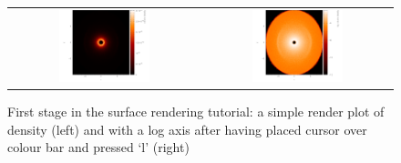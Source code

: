 \documentclass[a4paper,10pt]{article}
\begin{document}
\begin{figure}[h]
\begin{center}
\begin{tabular}{cc}
\includegraphics[width=0.5\textwidth]{surfpart1.png} &
\includegraphics[width=0.5\textwidth]{surfpart2.png}
\end{tabular}
\caption{First stage in the surface rendering tutorial: a simple render plot of density (left) and with a log axis after having placed cursor over colour bar and pressed `l' (right)}
\label{fig:surfpart1}
\end{center}
\end{figure}
\end{document}
